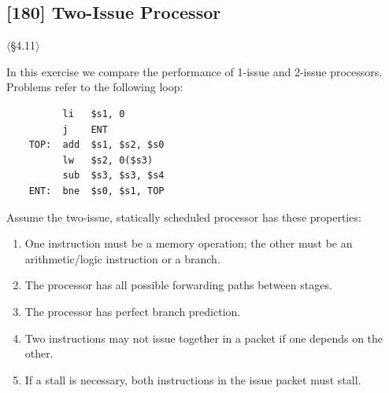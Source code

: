 \problembreak

\subsection{[180] Two-Issue Processor}
\hypertarget{prob-4.31}{}
\noindent$\langle$\S4.11$\rangle$\medskip

\noindent In this exercise we compare the performance of 1-issue and 2-issue
processors. Problems refer to the following loop:
\begin{verbatim}
          li   $s1, 0
          j    ENT
    TOP:  add  $s1, $s2, $s0
          lw   $s2, 0($s3)
          sub  $s3, $s3, $s4
    ENT:  bne  $s0, $s1, TOP
\end{verbatim}

\noindent Assume the two-issue, statically scheduled processor has these
properties:
\begin{enumerate}
  \item[1.] One instruction must be a memory operation; the other must be an
        arithmetic/logic instruction or a branch.
  \item[2.] The processor has all possible forwarding paths between stages.
  \item[3.] The processor has perfect branch prediction.
  \item[4.] Two instructions may not issue together in a packet if one
        depends on the other.
  \item[5.] If a stall is necessary, both instructions in the issue packet
        must stall.
\end{enumerate}

